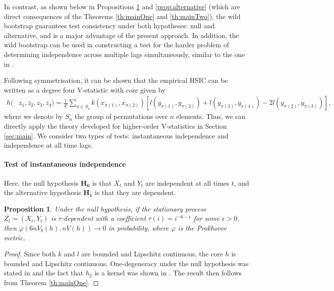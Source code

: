 \documentclass{article} %
\newtheorem{proposition}{Proposition}
\begin{document}
 In contrast, as shown below in Propositions \ref{prop:null} and \ref{prop:alternative} (which are direct consequences of the Theorems \ref{th:mainOne} and \ref{th:mainTwo}), the wild bootstrap guarantees test consistency under both hypotheses: null and alternative, and is a major advantage of the present approach. 
In addition,  the wild bootstrap can be used in constructing a test for the harder problem of determining independence across multiple lags simultaneously, similar to the one in \cite{besserve_statistical_2013}.

Following symmetrisation, it can be shown that the empirical HSIC can be written as a degree four V-statistic with core given by
\begin{align*}
h(&z_1,z_2,z_3,z_4) = \frac{1}{4!} \sum_{\pi \in S_4}  k(x_{\pi(1)},x_{\pi(2)}) [  l(y_{\pi(1)},y_{\pi(2)}) +  l(y_{\pi(3)},y_{\pi(4)}) - 2  l(y_{\pi(2)},y_{\pi(3)})],  
\end{align*}
where we denote by $S_n$ the group of permutations over $n$ elements. Thus, we can directly apply the theory developed for higher-order V-statistics in Section \ref{sec:main}. 
We consider two types of tests: instantaneous independence and independence at all time lags.


\paragraph{Test of instantaneous independence}
Here, the null hypothesis  $\mathbf{H_0}$ is that  $X_t$ and $Y_t$ are independent at all times $t$,  and the alternative hypothesis $\mathbf{H_1}$ is that they are dependent. 

\begin{proposition}
\label{prop:null}
Under the null hypothesis, if the stationary process $Z_t=\left(X_t,Y_t\right)$ is $\tau$-dependent with a coefficient $\tau(i) = i^{-6-\epsilon}$ for some $\epsilon>0$, then $\varphi(6 n V_b(h),n V(h))\to 0$ in probability, where $\varphi$ is the Prokhorov metric. 
\end{proposition}
\begin{proof}
Since both $k$ and $l$ are bounded and Lipschitz continuous, the core $h$ is bounded  and Lipschitz continuous. One-degeneracy under the null hypothesis was stated in \cite[Theorem 2]{gretton_kernel_2008} and the fact that $h_2$ is a kernel was shown in \cite[section A.2, following eq. 11]{gretton_kernel_2008}. The result then follows from Theorem \ref{th:mainOne}.
\end{proof}
\end{document}
